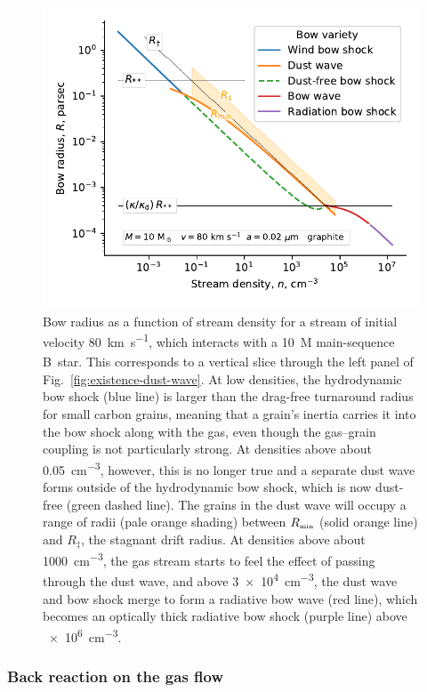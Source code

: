 \begin{figure}
  \includegraphics[width=\linewidth]{figs/onaxis-stats-plot-MS10-v080-gra002}
  \caption{Bow radius as a function of stream density for a stream of
    initial velocity \SI{80}{km.s^{-1}}, which interacts with a
    \SI{10}{M_\odot} main-sequence B~star.  This corresponds to a vertical
    slice through the left panel of
    Fig.~\ref{fig:existence-dust-wave}.  At low densities, the
    hydrodynamic bow shock (blue line) is larger than the drag-free
    turnaround radius for small carbon grains, meaning that a grain's
    inertia carries it into the bow shock along with the gas, even
    though the gas--grain coupling is not particularly strong.  At
    densities above about \SI{0.05}{cm^{-3}}, however, this is no
    longer true and a separate dust wave forms outside of the
    hydrodynamic bow shock, which is now dust-free (green dashed
    line).  The grains in the dust wave will occupy a range of radii
    (pale orange shading) between \(R_{\scriptscriptstyle\text{min}}\) (solid orange line) and
    \(R_\ddag\), the stagnant drift radius.  At densities above about
    \SI{1000}{cm^{-3}}, the gas stream starts to feel the effect of
    passing through the dust wave, and above \SI{3e4}{cm^{-3}}, the
    dust wave and bow shock merge to form a radiative bow wave (red
    line), which becomes an optically thick radiative bow shock
    (purple line) above \SI{e6}{cm^{-3}}.}
  \label{fig:decouple-vertical-cut}
\end{figure}

\subsubsection{Back reaction on the gas flow}
\label{sec:back-reaction-gas}

